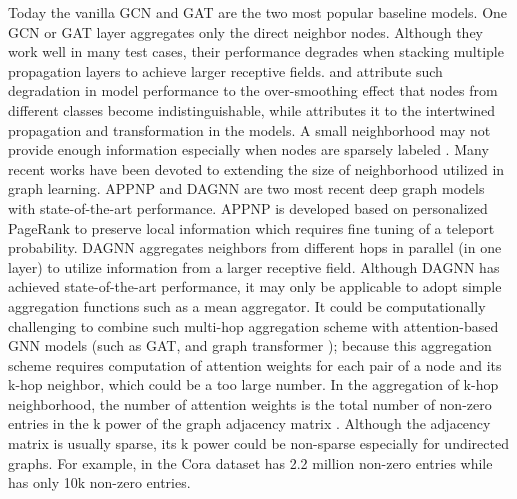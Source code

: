 \documentclass[lettersize,journal]{IEEEtran}
\theoremstyle{plain}
\theoremstyle{definition}
\theoremstyle{remark}
\begin{document}
Today the vanilla GCN and GAT are the two most popular baseline models. One GCN or GAT layer aggregates only the direct neighbor nodes. Although they work well in many test cases, their performance degrades when stacking multiple propagation layers to achieve larger receptive fields. \cite{xu2018representation} and \cite{li2018deeper} attribute such degradation in model performance to the over-smoothing effect that nodes from different classes become indistinguishable, while \cite{liu2020towards} attributes it to the intertwined propagation and transformation in the models. A small neighborhood may not provide enough information especially when nodes are sparsely labeled \cite{klicpera2018predict, liu2020towards}. Many recent works have been devoted to extending the size of neighborhood utilized in graph learning. APPNP \cite{klicpera2018predict} and DAGNN \cite{liu2020towards} are two most recent deep graph models with state-of-the-art performance. APPNP \cite{klicpera2018predict} is developed based on personalized PageRank to preserve local information which requires fine tuning of a teleport probability. DAGNN \cite{liu2020towards} aggregates neighbors from different hops in parallel (in one layer) to utilize information from a larger receptive field. Although DAGNN has achieved state-of-the-art performance, it may only be applicable to adopt simple aggregation functions such as a mean aggregator. It could be computationally challenging to combine such multi-hop aggregation scheme with attention-based GNN models (such as GAT, and graph transformer \cite{dwivedi2020generalization, hu2020heterogeneous}); because this aggregation scheme requires computation of attention weights for each pair of a node and its k-hop neighbor, which could be a too large number. In the aggregation of k-hop neighborhood, the number of attention weights is the total number of non-zero entries in the k power of the graph adjacency matrix . Although the adjacency matrix is usually sparse, its k power could be non-sparse especially for undirected graphs. For example, in the Cora dataset \cite{wang2019dgl}  has 2.2 million non-zero entries while  has only 10k non-zero entries. 
\end{document}
